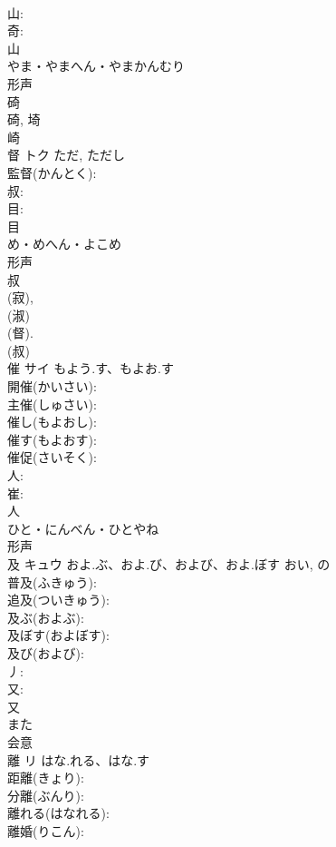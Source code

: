 \documentclass[8pt]{extreport}
\begin{document}
\begin{CJK}{UTF8}{min}
\\	山: 
\\	奇: 
\\	山	
\\	やま・やまへん・やまかんむり	
\\	形声 
\\	碕 
\\	碕, 埼 
\\	崎 
\\	督	トク		ただ, ただし	
\\	監督(かんとく): 
\\	叔: 
\\	目: 
\\	目	
\\	め・めへん・よこめ	
\\	形声 
\\	叔 
\\	(寂), 
\\	(淑) 
\\	(督). 
\\	(叔) 
\\	催	サイ	もよう.す、もよお.す		
\\	開催(かいさい): 
\\	主催(しゅさい): 
\\	催し(もよおし): 
\\	催す(もよおす): 
\\	催促(さいそく): 
\\	人: 
\\	崔: 
\\	人	
\\	ひと・にんべん・ひとやね	
\\	形声 
\\	及	キュウ	およ.ぶ、およ.び、および、およ.ぼす	おい, の	
\\	普及(ふきゅう): 
\\	追及(ついきゅう): 
\\	及ぶ(およぶ): 
\\	及ぼす(およぼす): 
\\	及び(および): 
\\	丿: 
\\	又: 
\\	又	
\\	また	
\\	会意 
\\	離	リ	はな.れる、はな.す		
\\	距離(きょり): 
\\	分離(ぶんり): 
\\	離れる(はなれる): 
\\	離婚(りこん): 

\end{CJK}
\end{document}

